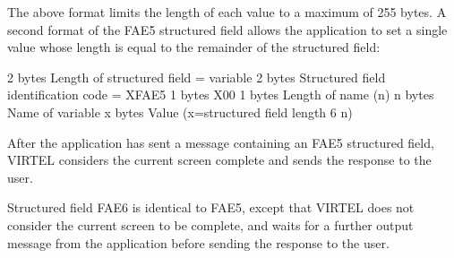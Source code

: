 \documentclass[letterpaper,10pt,english]{sphinxmanual}
\begin{document}
The above format limits the length of each value to a maximum of 255 bytes. A second format of the FAE5 structured
field allows the application to set a single value whose length is equal to the remainder of the structured field:

\begin{sphinxVerbatim}[commandchars=\\\{\}]
\PYGZhy{} 2 bytes Length of structured field = variable
\PYGZhy{} 2 bytes Structured field identification code = X\PYGZsq{}FAE5\PYGZsq{}
\PYGZhy{} 1 bytes X\PYGZsq{}00\PYGZsq{}
\PYGZhy{} 1 bytes Length of name (n)
\PYGZhy{} n bytes Name of variable
\PYGZhy{} x bytes Value (x=structured field length \textendash{} 6 \textendash{} n)
\end{sphinxVerbatim}


After the application has sent a message containing an FAE5 structured field, VIRTEL considers the current screen
complete and sends the response to the user.


Structured field FAE6 is identical to FAE5, except that VIRTEL does not consider the current screen to be complete, and
waits for a further output message from the application before sending the response to the user.

\end{document}
